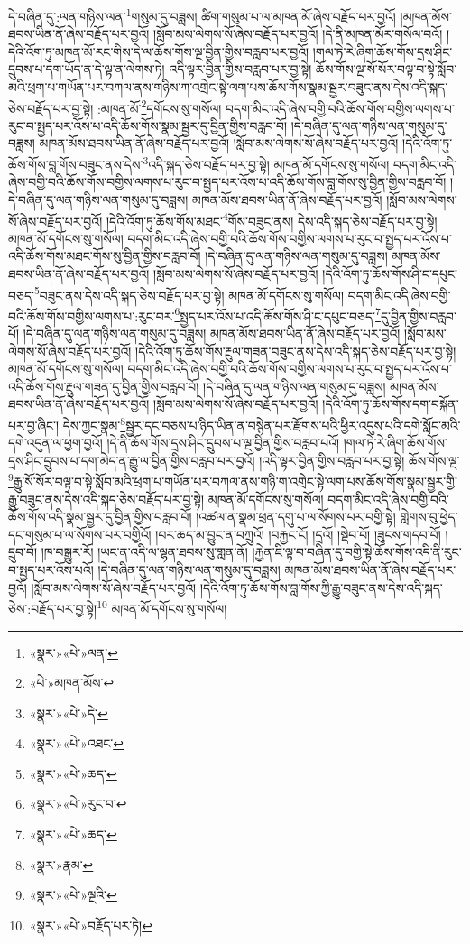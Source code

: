 དེ་བཞིན་དུ་:ལན་གཉིས་ལན་\footnote{«སྣར་»«པེ་»ལན་}གསུམ་དུ་བཟླས། ཚིག་གསུམ་པ་ལ་མཁན་མོ་ཞེས་བརྗོད་པར་བྱའོ། །མཁན་མོས་ཐབས་ཡིན་ནོ་ཞེས་བརྗོད་པར་བྱའོ། །སློབ་མས་ལེགས་སོ་ཞེས་བརྗོད་པར་བྱའོ། །དེ་ནི་མཁན་མོར་གསོལ་བའོ། །དེའི་འོག་ཏུ་མཁན་མོ་རང་གིས་དེ་ལ་ཆོས་གོས་ལྔ་བྱིན་གྱིས་བརླབ་པར་བྱའོ། །གལ་ཏེ་རེ་ཞིག་ཆོས་གོས་དྲས་ཤིང་དྲུབས་པ་དག་ཡོད་ན་དེ་ལྟ་ན་ལེགས་ཏེ། འདི་ལྟར་བྱིན་གྱིས་བརླབ་པར་བྱ་སྟེ། ཆོས་གོས་ལྔ་སོ་སོར་བལྟ་བ་སྟེ་སློབ་མའི་ཕྲག་པ་གཡོན་པར་བཀལ་ནས་གཉིས་ཀ་འགྲེང་སྟེ་ལག་པས་ཆོས་གོས་སྣམ་སྦྱར་བཟུང་ནས་དེས་འདི་སྐད་ཅེས་བརྗོད་པར་བྱ་སྟེ། :མཁན་མོ་\footnote{«པེ་»མཁན་མོས་}དགོངས་སུ་གསོལ། བདག་མིང་འདི་ཞེས་བགྱི་བའི་ཆོས་གོས་བགྱིས་ལགས་པ་རུང་བ་སྤྱད་པར་འོས་པ་འདི་ཆོས་གོས་སྣམ་སྦྱར་དུ་བྱིན་གྱིས་བརླབ་བོ། །དེ་བཞིན་དུ་ལན་གཉིས་ལན་གསུམ་དུ་བཟླས། མཁན་མོས་ཐབས་ཡིན་ནོ་ཞེས་བརྗོད་པར་བྱའོ། །སློབ་མས་ལེགས་སོ་ཞེས་བརྗོད་པར་བྱའོ། །དེའི་འོག་ཏུ་ཆོས་གོས་བླ་གོས་བཟུང་ནས་དེས་\footnote{«སྣར་»«པེ་»དེ་}འདི་སྐད་ཅེས་བརྗོད་པར་བྱ་སྟེ། མཁན་མོ་དགོངས་སུ་གསོལ། བདག་མིང་འདི་ཞེས་བགྱི་བའི་ཆོས་གོས་བགྱིས་ལགས་པ་རུང་བ་སྤྱད་པར་འོས་པ་འདི་ཆོས་གོས་བླ་གོས་སུ་བྱིན་གྱིས་བརླབ་བོ། །དེ་བཞིན་དུ་ལན་གཉིས་ལན་གསུམ་དུ་བཟླས། མཁན་མོས་ཐབས་ཡིན་ནོ་ཞེས་བརྗོད་པར་བྱའོ། །སློབ་མས་ལེགས་སོ་ཞེས་བརྗོད་པར་བྱའོ། །དེའི་འོག་ཏུ་ཆོས་གོས་མཐང་\footnote{«སྣར་»«པེ་»འཐང་}གོས་བཟུང་ནས། དེས་འདི་སྐད་ཅེས་བརྗོད་པར་བྱ་སྟེ། མཁན་མོ་དགོངས་སུ་གསོལ། བདག་མིང་འདི་ཞེས་བགྱི་བའི་ཆོས་གོས་བགྱིས་ལགས་པ་རུང་བ་སྤྱད་པར་འོས་པ་འདི་ཆོས་གོས་མཐང་གོས་སུ་བྱིན་གྱིས་བརླབ་བོ། །དེ་བཞིན་དུ་ལན་གཉིས་ལན་གསུམ་དུ་བཟླས། མཁན་མོས་ཐབས་ཡིན་ནོ་ཞེས་བརྗོད་པར་བྱའོ། །སློབ་མས་ལེགས་སོ་ཞེས་བརྗོད་པར་བྱའོ། །དེའི་འོག་ཏུ་ཆོས་གོས་ཤི་ང་དཔུང་བཅད་\footnote{«སྣར་»«པེ་»ཆད་}བཟུང་ནས་དེས་འདི་སྐད་ཅེས་བརྗོད་པར་བྱ་སྟེ། མཁན་མོ་དགོངས་སུ་གསོལ། བདག་མིང་འདི་ཞེས་བགྱི་བའི་ཆོས་གོས་བགྱིས་ལགས་པ་:རུང་བར་\footnote{«སྣར་»«པེ་»རུང་བ་}སྤྱད་པར་འོས་པ་འདི་ཆོས་གོས་ཤི་ང་དཔུང་བཅད་\footnote{«སྣར་»«པེ་»ཆད་}དུ་བྱིན་གྱིས་བརླབ་པོ། །དེ་བཞིན་དུ་ལན་གཉིས་ལན་གསུམ་དུ་བཟླས། མཁན་མོས་ཐབས་ཡིན་ནོ་ཞེས་བརྗོད་པར་བྱའོ། །སློབ་མས་ལེགས་སོ་ཞེས་བརྗོད་པར་བྱའོ། །དེའི་འོག་ཏུ་ཆོས་གོས་རྔུལ་གཟན་བཟུང་ནས་དེས་འདི་སྐད་ཅེས་བརྗོད་པར་བྱ་སྟེ། མཁན་མོ་དགོངས་སུ་གསོལ། བདག་མིང་འདི་ཞེས་བགྱི་བའི་ཆོས་གོས་བགྱིས་ལགས་པ་རུང་བ་སྤྱད་པར་འོས་པ་འདི་ཆོས་གོས་རྔུལ་གཟན་དུ་བྱིན་གྱིས་བརླབ་བོ། །དེ་བཞིན་དུ་ལན་གཉིས་ལན་གསུམ་དུ་བཟླས། མཁན་མོས་ཐབས་ཡིན་ནོ་ཞེས་བརྗོད་པར་བྱའོ། །སློབ་མས་ལེགས་སོ་ཞེས་བརྗོད་པར་བྱའོ། །དེའི་འོག་ཏུ་ཆོས་གོས་དག་བསྐོན་པར་བྱ་ཞིང་། དེས་ཀྱང་སྣམ་\footnote{«སྣར་»རྣམ་}སྦྱར་དང་བཅས་པ་ཉིད་ཡིན་ན་བསྙེན་པར་རྫོགས་པའི་ཕྱིར་འདུས་པའི་དགེ་སློང་མའི་དགེ་འདུན་ལ་ཕྱག་བྱའོ། །དེ་ནི་ཆོས་གོས་དྲས་ཤིང་དྲུབས་པ་ལྔ་བྱིན་གྱིས་བརླབ་པའོ། །གལ་ཏེ་རེ་ཞིག་ཆོས་གོས་དྲས་ཤིང་དྲུབས་པ་དག་མེད་ན་རྒྱུ་ལ་བྱིན་གྱིས་བརླབ་པར་བྱའོ། །འདི་ལྟར་བྱིན་གྱིས་བརླབ་པར་བྱ་སྟེ། ཆོས་གོས་ལྔ་\footnote{«སྣར་»«པེ་»ལྔའི་}རྒྱུ་སོ་སོར་བལྟ་བ་སྟེ་སློབ་མའི་ཕྲག་པ་གཡོན་པར་བཀལ་ནས་གཉི་ག་འགྲེང་སྟེ་ལག་པས་ཆོས་གོས་སྣམ་སྦྱར་གྱི་རྒྱུ་བཟུང་ནས་དེས་འདི་སྐད་ཅེས་བརྗོད་པར་བྱ་སྟེ། མཁན་མོ་དགོངས་སུ་གསོལ། བདག་མིང་འདི་ཞེས་བགྱི་བའི་ཆོས་གོས་འདི་སྣམ་སྦྱར་དུ་བྱིན་གྱིས་བརླབ་བོ། །འཚལ་ན་སྣམ་ཕྲན་དགུ་པ་ལ་སོགས་པར་བགྱི་སྟེ། གླེགས་བུ་ཕྱེད་དང་གསུམ་པ་ལ་སོགས་པར་བགྱིའོ། །བར་ཆད་མ་བྱུང་ན་བཀྲུའོ། །བརྐྱང་ངོ། །དྲའོ། །སྡེབ་བོ། །ཟུངས་གདབ་བོ། །དྲུབ་བོ། །ཁ་བསྒྱུར་རོ། །ཡང་ན་འདི་ལ་ལྷན་ཐབས་སུ་གླན་ནོ། །རྐྱེན་ཇི་ལྟ་བ་བཞིན་དུ་བགྱི་སྟེ་ཆོས་གོས་འདི་ནི་རུང་བ་སྤྱད་པར་འོས་པའོ། །དེ་བཞིན་དུ་ལན་གཉིས་ལན་གསུམ་དུ་བཟླས། མཁན་མོས་ཐབས་ཡིན་ནོ་ཞེས་བརྗོད་པར་བྱའོ། །སློབ་མས་ལེགས་སོ་ཞེས་བརྗོད་པར་བྱའོ། །དེའི་འོག་ཏུ་ཆོས་གོས་བླ་གོས་ཀྱི་རྒྱུ་བཟུང་ནས་དེས་འདི་སྐད་ཅེས་:བརྗོད་པར་བྱ་སྟེ།\footnote{«སྣར་»«པེ་»བརྗོད་པར་ཏེ།} མཁན་མོ་དགོངས་སུ་གསོལ། 